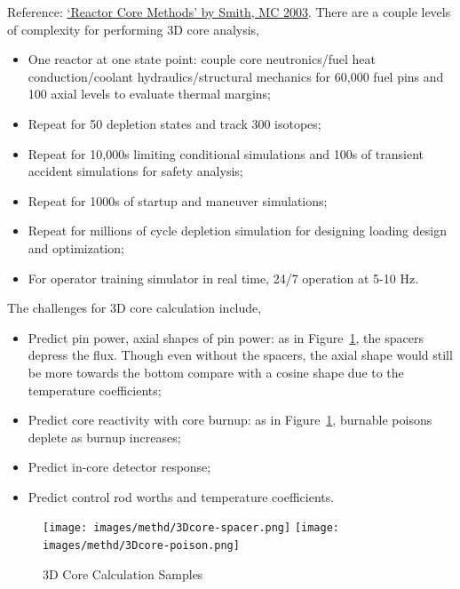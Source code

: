 \documentclass{school-22.211-notes}
\date{May  2, 2012}
\begin{document}
\maketitle

Reference: \href{www.oecd-nea.org/dbprog/documents/MC03Smith.pdf}{`Reactor Core Methods' by Smith, MC 2003}. 
There are a couple levels of complexity for performing 3D core analysis,
\begin{itemize}
\item One reactor at one state point: couple core neutronics/fuel heat conduction/coolant hydraulics/structural mechanics for 60,000 fuel pins and 100 axial levels to evaluate thermal margins;
\item Repeat for 50 depletion states and track 300 isotopes;
\item Repeat for 10,000s limiting conditional simulations and 100s of transient accident simulations for safety analysis;
\item Repeat for 1000s of startup and maneuver simulations;
\item Repeat for millions of cycle depletion simulation for designing loading design and optimization;
\item For operator training simulator in real time, 24/7 operation at 5-10 Hz. 
\end{itemize}
The challenges for 3D core calculation include,
\begin{itemize}
\item Predict pin power, axial shapes of pin power: as in Figure~\ref{3Dcore}, the spacers depress the flux. Though even without the spacers, the axial shape would still be more towards the bottom compare with a cosine shape due to the temperature coefficients; 
\item Predict core reactivity with core burnup: as in Figure~\ref{3Dcore}, burnable poisons deplete as burnup increases;
\item Predict in-core detector response;
\item Predict control rod worths and temperature coefficients. 
\end{itemize}
\begin{figure}[ht]
  \centering
  \texttt{[image: images/methd/3Dcore-spacer.png]}
  \texttt{[image: images/methd/3Dcore-poison.png]}
  \caption{3D Core Calculation Samples} \label{3Dcore}
\end{figure}
\end{document}
